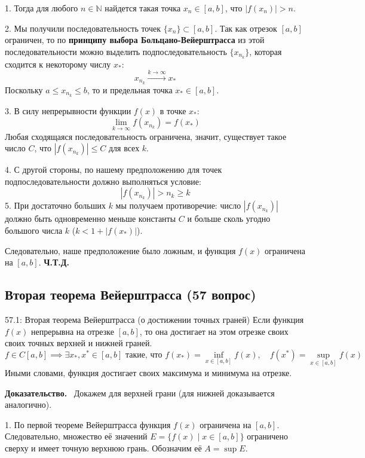 \documentclass[a4paper,12pt]{article}
\newcommand{\myproof}{\textbf{Доказательство.}\ }
\begin{document}
	1. Тогда для любого $n \in \mathbb{N}$ найдется такая точка $x_n \in [a, b]$, что $|f(x_n)| > n$.
	
	2. Мы получили последовательность точек $\{x_n\} \subset [a, b]$. Так как отрезок $[a, b]$ ограничен, то по \textbf{принципу выбора Больцано-Вейерштрасса} из этой последовательности можно выделить подпоследовательность $\{x_{n_k}\}$, которая сходится к некоторому числу $x_*$:
	$$ x_{n_k} \xrightarrow{k \to \infty} x_* $$
	Поскольку $a \leq x_{n_k} \leq b$, то и предельная точка $x_* \in [a, b]$.
	
	3. В силу непрерывности функции $f(x)$ в точке $x_*$:
	$$ \lim_{k \to \infty} f(x_{n_k}) = f(x_*) $$
	Любая сходящаяся последовательность ограничена, значит, существует такое число $C$, что $|f(x_{n_k})| \leq C$ для всех $k$.
	
	4. С другой стороны, по нашему предположению для точек подпоследовательности должно выполняться условие:
	$$ |f(x_{n_k})| > n_k \geq k $$
	5. При достаточно больших $k$ мы получаем противоречие: число $|f(x_{n_k})|$ должно быть одновременно меньше константы $C$ и больше сколь угодно большого числа $k$ ($k < 1 + |f(x_*)|$).
	
	Следовательно, наше предположение было ложным, и функция $f(x)$ ограничена на $[a, b]$. \textbf{Ч.Т.Д.}
	
	
	
	
	
	\newpage
	\subsection{Вторая теорема Вейерштрасса (57 вопрос)}
	
	\begin{theorembox}{57.1: Вторая теорема Вейерштрасса (о достижении точных граней)}
		Если функция $f(x)$ непрерывна на отрезке $[a, b]$, то она достигает на этом отрезке своих своих точных верхней и нижней граней.
		$$ f \in C[a, b] \implies \exists x_*, x^* \in [a, b] \text{ такие, что } f(x_*) = \inf_{x \in [a, b]} f(x), \quad f(x^*) = \sup_{x \in [a, b]} f(x) $$
		Иными словами, функция достигает своих максимума и минимума на отрезке.
	\end{theorembox}
	
	\myproof
	Докажем для верхней грани (для нижней доказывается аналогично).
	
	1. По первой теореме Вейерштрасса функция $f(x)$ ограничена на $[a, b]$. Следовательно, множество её значений $E = \{f(x) \mid x \in [a, b]\}$ ограничено сверху и имеет точную верхнюю грань. Обозначим её $A = \sup E$.
	
\end{document}
